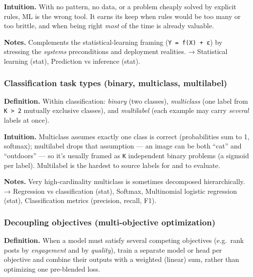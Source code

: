 \documentclass[
  10pt,
  letterpaper,
  onecolumn]{article}
\begin{document}
\textbf{Intuition.} With no pattern, no data, or a problem cheaply
solved by explicit rules, ML is the wrong tool. It earns its keep when
rules would be too many or too brittle, and when being right \emph{most}
of the time is already valuable.

\textbf{Notes.} Complements the statistical-learning framing
(\texttt{Y\ =\ f(X)\ +\ ε}) by stressing the \emph{systems}
preconditions and deployment realities. → Statistical learning (stat),
Prediction vs inference (stat).

\hypertarget{classification-task-types-binary-multiclass-multilabel}{%
\subsubsection{Classification task types (binary, multiclass,
multilabel)}\label{classification-task-types-binary-multiclass-multilabel}}

\textbf{Definition.} Within classification: \emph{binary} (two classes),
\emph{multiclass} (one label from \texttt{K\ \textgreater{}\ 2} mutually
exclusive classes), and \emph{multilabel} (each example may carry
\emph{several} labels at once).

\textbf{Intuition.} Multiclass assumes exactly one class is correct
(probabilities sum to 1, softmax); multilabel drops that assumption ---
an image can be both ``cat'' and ``outdoors'' --- so it's usually framed
as \texttt{K} independent binary problems (a sigmoid per label).
Multilabel is the hardest to source labels for and to evaluate.

\textbf{Notes.} Very high-cardinality multiclass is sometimes decomposed
hierarchically. → Regression vs classification (stat), Softmax,
Multinomial logistic regression (stat), Classification metrics
(precision, recall, F1).

\hypertarget{decoupling-objectives-multi-objective-optimization}{%
\subsubsection{Decoupling objectives (multi-objective
optimization)}\label{decoupling-objectives-multi-objective-optimization}}

\textbf{Definition.} When a model must satisfy several competing
objectives (e.g.~rank posts by \emph{engagement} and by \emph{quality}),
train a separate model or head per objective and combine their outputs
with a weighted (linear) sum, rather than optimizing one pre-blended
loss.
\end{document}
